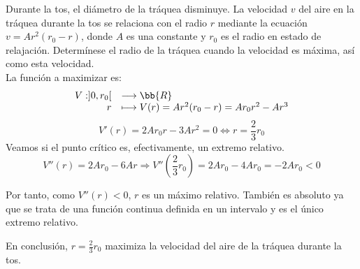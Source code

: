 \begin{ejercicio}
    Durante la tos, el diámetro de la tráquea disminuye. La velocidad $v$ del aire en la tráquea durante la tos se relaciona con el radio $r$ mediante la ecuación $v=Ar^2(r_0-r)$, donde $A$ es una constante y $r_0$ es el radio en estado de relajación. Determínese el radio de la tráquea cuando la velocidad es máxima, así como esta velocidad.\\

    La función a maximizar es:
    \begin{equation*}
        \begin{array}{rl}
            V:]0, r_0[ & \longrightarrow \bb{R}\\
                    r & \longmapsto V(r)=Ar^2(r_0 - r) = Ar_0r^2 - Ar^3
        \end{array}
    \end{equation*}
    \begin{equation*}
        V'(r) = 2Ar_0r - 3Ar^2 = 0 \Longleftrightarrow r=\frac{2}{3}r_0
    \end{equation*}
    Veamos si el punto crítico es, efectivamente, un extremo relativo.
    \begin{equation*}
        V''(r) = 2Ar_0 - 6Ar \Longrightarrow V''\left(\frac{2}{3}r_0\right) = 2Ar_0 - 4Ar_0 = -2Ar_0 < 0
    \end{equation*}
    
    Por tanto, como $V''(r)<0$, $r$ es un máximo relativo. También es absoluto ya que se trata de una función continua definida en un intervalo y es el único extremo relativo.
    
    En conclusión, $r=\frac{2}{3}r_0$ maximiza la velocidad del aire de la tráquea durante la tos.    
\end{ejercicio}

